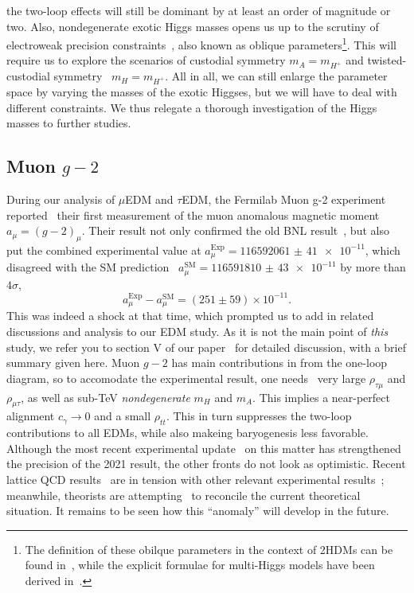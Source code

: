 the two-loop effects will still be dominant by at least an order of magnitude or two.
Also, nondegenerate exotic Higgs masses opens us up to the scrutiny of electroweak precision constraints~\cite{PDG2022}, 
also known as oblique parameters\footnote{The definition of these obilque parameters in the context of 2HDMs can be found in~\cite{Maksymyk1994ObliqueParam2HDM}, while the explicit formulae for multi-Higgs models have been derived in~\cite{Grimus2008ObliqueParam-1,Grimus2008ObliqueParam-2}.}.
This will require us to explore the scenarios of custodial symmetry \(m_{A} = m_{H^{+}} \) and twisted-custodial symmetry~\cite{Gerard2007TwistedCustodial} \(m_{H} = m_{H^{+}} \).
All in all, we can still enlarge the parameter space by varying the masses of the exotic Higgses, but we will have to deal with different constraints.
We thus relegate a thorough investigation of the Higgs masses to further studies.

\subsection{Muon \(g-2 \)}
During our analysis of \(\mu \)EDM and \(\tau \)EDM, the Fermilab Muon g-2 experiment reported~\cite{Fermilab2021MuonGminus2} their first measurement of the muon anomalous magnetic moment \(a_{\mu} = (g-2)_{\mu} \).
Their result not only confirmed the old BNL result~\cite{BNL2006MuonGminus2}, but also put the combined experimental value at \(a_{\mu}^{\text{Exp}} = \num{116592061(41)e-11} \),
which disagreed with the SM prediction~\cite{Aoyama2020MuonTheory} \(a_{\mu}^{\text{SM}} = \num{116591810(43)e-11} \) by more than \(4\sigma \),
\begin{equation}
    a_{\mu}^{\text{Exp}} - a_{\mu}^{\text{SM}} = (251 \pm 59) \times 10^{-11}.
\end{equation}
This was indeed a shock at that time, which prompted us to add in related discussions and analysis to our EDM study.
As it is not the main point of \textit{this} study, we refer you to section V of our paper~\cite{HKT2022MuonEDMTauEDM} for detailed discussion, with a brief summary given here.
Muon \(g-2 \) has main contributions in {\gthdm} from the one-loop diagram, so to accomodate the experimental result, 
one needs~\cite{HouEtal2021Muon} very large \(\rho_{\tau\mu} \) and \(\rho_{\mu\tau} \), as well as sub-TeV \textit{nondegenerate} \(m_{H} \) and \(m_{A} \).
This implies a near-perfect alignment \(c_{\gamma} \to 0\) and a small \(\rho_{tt} \).
This in turn suppresses the two-loop contributions to all EDMs, while also makeing baryogenesis less favorable.
Although the most recent experimental update~\cite{Muon2023Gminus2} on this matter has strengthened the precision of the 2021 result, 
the other fronts do not look as optimistic.
Recent lattice QCD results~\cite{Borsanyi2021Lattice} are in tension with other relevant experimental results~\cite{CMD32023eetopipi};
meanwhile, theorists are attempting~\cite{Colangelo2022Gminus2theory} to reconcile the current theoretical situation.
It remains to be seen how this ``anomaly'' will develop in the future.

